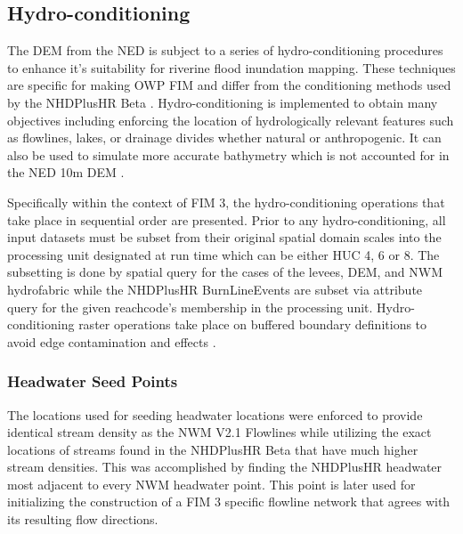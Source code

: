 \subsection{Hydro-conditioning}

The DEM from the NED is subject to a series of hydro-conditioning procedures to enhance it's suitability for riverine flood inundation mapping. 
These techniques are specific for making OWP FIM and differ from the conditioning methods used by the NHDPlusHR Beta \cite{moore2019user}.
Hydro-conditioning is implemented to obtain many objectives including enforcing the location of hydrologically relevant features such as flowlines, lakes, or drainage divides whether natural or anthropogenic. 
It can also be used to simulate more accurate bathymetry which is not accounted for in the NED 10m DEM \cite{gesch2002national}.


Specifically within the context of FIM 3, the hydro-conditioning operations that take place in sequential order are presented. 
Prior to any hydro-conditioning, all input datasets must be subset from their original spatial domain scales into the processing unit designated at run time which can be either HUC 4, 6 or 8. 
The subsetting is done by spatial query for the cases of the levees, DEM, and NWM hydrofabric while the NHDPlusHR BurnLineEvents are subset via attribute query for the given reachcode's membership in the processing unit.
Hydro-conditioning raster operations take place on buffered boundary definitions to avoid edge contamination and effects \cite{lindsay2013measuring}. 

\subsubsection{Headwater Seed Points} 

The locations used for seeding headwater locations were enforced to provide identical stream density as the NWM V2.1 Flowlines while utilizing the exact locations of streams found in the NHDPlusHR Beta that have much higher stream densities. 
This was accomplished by finding the NHDPlusHR headwater most adjacent to every NWM headwater point. 
This point is later used for initializing the construction of a FIM 3 specific flowline network that agrees with its resulting flow directions.

